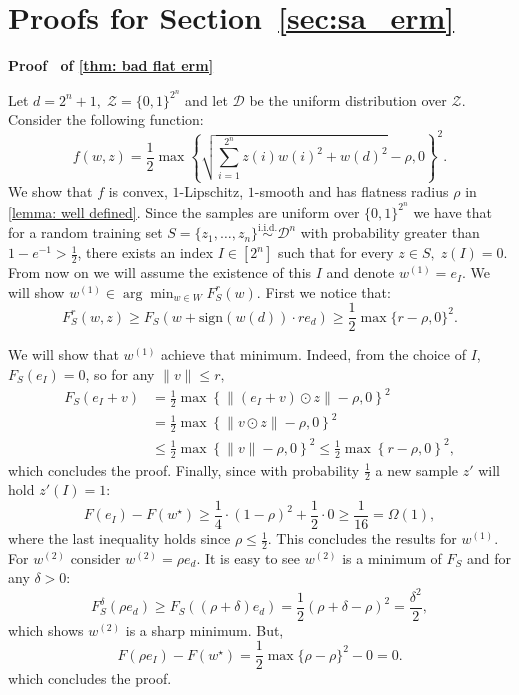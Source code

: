 \documentclass[11pt]{article}
\newcommand{\rad}{r}
\renewenvironment{proof}[1][]{%
  \par\noindent\textbf{\upshape Proof%
  \if\relax\detokenize{#1}\relax\else\ #1\fi}\ %
}{\jmlrQED}
\begin{document}

\newpage
\appendix






\section{Proofs for Section~\ref{sec:sa_erm}}\label{sec:proof_main} \label{sec:proof_sa_erm}
\begin{proof}[of \cref{thm: bad flat erm}]
Let $d= 2^n + 1,\;\mathcal{Z}= \{0,1\}^{2^n}$ and let $\mathcal{D}$ be the uniform distribution over $\mathcal{Z}$. Consider the following function: 
$$f(w,z) = \frac{1}{2}\max\left\{ \sqrt{\sum_{i=1}^{2^n} z(i)w(i)^2 + w(d)^2} - \rho,0 \right\}^2.$$
We show that $f$ is convex, $1$-Lipschitz, $1$-smooth and has flatness radius $\rho$ in \cref{lemma: well defined}. Since the samples are uniform over $\{0,1\}^{2^n}$ we have that for a random training set $S = \{z_1, \dots, z_n\} \overset{\text{i.i.d.}}{\sim} \mathcal{D}^n$ with probability greater than $1-e^{-1} > \frac{1}{2}$, there exists an index $I \in [2^n]$ such that for every $z\in S, \; z(I) =0$. From now on we will assume the existence of this $I$ and denote $w^{(1)} = e_I$. We will show $w^{(1)} \in \arg\min_{w \in W} F_S^{\rad}(w)$. First we notice that: 
$$F_S^{\rad}(w,z) \geq F_S(w + \text{sign}(w(d)) \cdot \rad e_{d}) \geq \frac{1}{2}\max\{\rad - \rho ,0\}^2. $$


We will show that $w^{(1)}$ achieve that minimum. Indeed, from the choice of $I$, $F_S(e_I) = 0$, so for any $\|v\| \leq \rad,$
\begin{align*}
    F_S(e_I + v) & = \frac{1}{2} \max\left\{ \|(e_I + v) \odot z\| - \rho,0 \right\}^2 \\
    & = \frac{1}{2} \max\left\{ \|v \odot z\| - \rho,0 \right\}^2 \\
    & \leq \frac{1}{2} \max\left\{ \|v\| - \rho,0 \right\}^2 \leq \frac{1}{2} \max\left\{ \rad - \rho,0 \right\}^2,  
\end{align*}
which concludes the proof. Finally, since with probability $\frac{1}{2}$ a new sample $z'$ will hold $z'(I) = 1$:
$$F(e_I) - F(w^\star) \geq \frac{1}{4} \cdot (1-\rho)^2 + \frac{1}{2} \cdot 0 \geq \frac{1}{16} = \Omega(1),$$
where the last inequality holds since $\rho \leq \frac{1}{2}$.
This concludes the results for $w^{(1)}$. For $w^{(2)}$ consider $w^{(2)} = \rho e_d$. It is easy to see $w^{(2)}$ is a minimum of $F_S$ and for any $\delta > 0$: 
$$F_S^{\delta}(\rho e_d) \geq F_S((\rho + \delta)e_d) = \frac{1}{2} (\rho + \delta - \rho)^2 = \frac{\delta^2}{2},$$ 
which shows $w^{(2)}$ is a sharp minimum. But,
$$F(\rho e_I) - F(w^{\star}) = \frac{1}{2}\max\{\rho - \rho\}^2 - 0 = 0.$$
which concludes the proof.
\end{proof}
\end{document}
